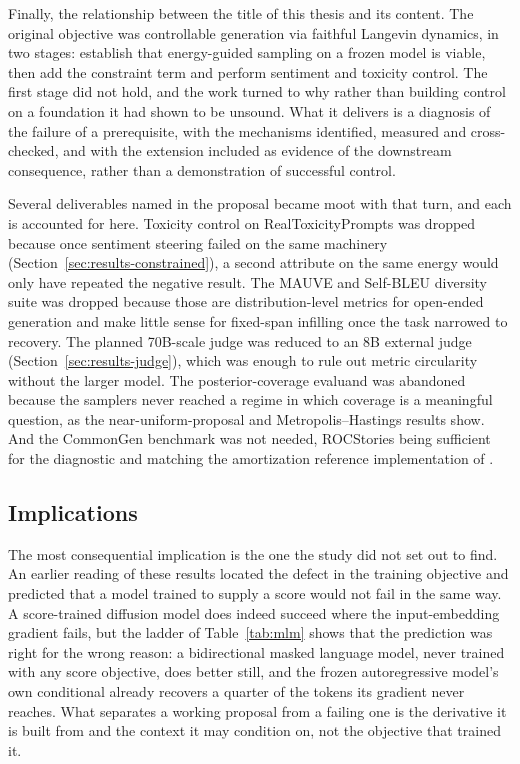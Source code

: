 Finally, the relationship between the title of this thesis and its content. The original objective was controllable generation via faithful Langevin dynamics, in two stages: establish that energy-guided sampling on a frozen model is viable, then add the constraint term and perform sentiment and toxicity control. The first stage did not hold, and the work turned to why rather than building control on a foundation it had shown to be unsound. What it delivers is a diagnosis of the failure of a prerequisite, with the mechanisms identified, measured and cross-checked, and with the extension included as evidence of the downstream consequence, rather than a demonstration of successful control.

Several deliverables named in the proposal became moot with that turn, and each is accounted for here. Toxicity control on RealToxicityPrompts was dropped because once sentiment steering failed on the same machinery (Section~\ref{sec:results-constrained}), a second attribute on the same energy would only have repeated the negative result. The MAUVE and Self-BLEU diversity suite was dropped because those are distribution-level metrics for open-ended generation and make little sense for fixed-span infilling once the task narrowed to recovery. The planned 70B-scale judge was reduced to an 8B external judge (Section~\ref{sec:results-judge}), which was enough to rule out metric circularity without the larger model. The posterior-coverage evaluand was abandoned because the samplers never reached a regime in which coverage is a meaningful question, as the near-uniform-proposal and Metropolis--Hastings results show. And the CommonGen benchmark was not needed, ROCStories being sufficient for the diagnostic and matching the amortization reference implementation of \citet{hu2024amortizing}.

\subsection{Implications}
\label{sec:disc-future}

The most consequential implication is the one the study did not set out to find. An earlier reading of these results located the defect in the training objective and predicted that a model trained to supply a score would not fail in the same way. A score-trained diffusion model does indeed succeed where the input-embedding gradient fails, but the ladder of Table~\ref{tab:mlm} shows that the prediction was right for the wrong reason: a bidirectional masked language model, never trained with any score objective, does better still, and the frozen autoregressive model's own conditional already recovers a quarter of the tokens its gradient never reaches. What separates a working proposal from a failing one is the derivative it is built from and the context it may condition on, not the objective that trained it.

